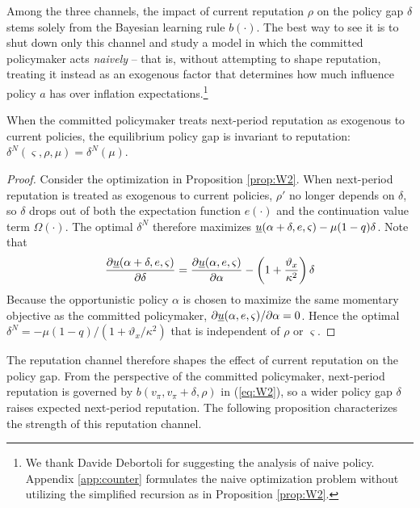 \documentclass[12pt,letter,leqno]{article}
\theoremstyle{asn}
\theoremstyle{lem}
\theoremstyle{slem}
\theoremstyle{prop}
\theoremstyle{appprop}
\theoremstyle{rem}
\theoremstyle{defn}
\begin{document}
Among the three channels, the impact of current reputation $\rho$ on the policy gap $\delta$ stems solely from the Bayesian learning rule $b(\cdot)$. The best way to see it is to shut down only this channel and study a model in which the committed policymaker acts \textit{naively} -- that is, without attempting to shape reputation, treating it instead as an exogenous factor that determines how much influence policy $a$ has over inflation expectations.\footnote{We thank Davide Debortoli for suggesting the analysis of naive policy. Appendix \ref{app:counter} formulates the naive optimization problem without utilizing the simplified recursion as in Proposition \ref{prop:W2}. }

\begin{prop}\label{prop:naive_delta}%
When the committed policymaker treats next-period reputation as exogenous to current policies, the equilibrium policy gap is invariant to reputation: $\delta^N(\varsigma,\rho,\mu)=\delta^N(\mu)$.
\end{prop}

\begin{proof}
Consider the optimization in Proposition \ref{prop:W2}. When next-period reputation is treated as exogenous to current policies, $\rho'$ no longer depends on $\delta$, so $\delta$ drops out of both the expectation function $e(\cdot)$ and the continuation value term $\Omega(\cdot)$. The optimal $\delta^N$ therefore maximizes $\uline{u}(\alpha+\delta,e,\varsigma)-\mu(1-q)\delta$. Note that 
\begin{align}\label{eq:foc_delta}
    \frac{\partial \uline{u}(\alpha+\delta,e,\varsigma)}{\partial \delta} = \frac{\partial \uline{u}(\alpha,e,\varsigma)}{\partial \alpha} -\left(1+\frac{\vartheta_x}{\kappa^2}\right)\delta
\end{align}
Because the opportunistic policy $\alpha$ is chosen to maximize the same momentary objective as the committed policymaker, $\partial \uline{u}(\alpha,e,\varsigma)/\partial \alpha=0$. Hence the optimal $\delta^N=-\mu(1-q)/(1+\vartheta_x/\kappa^2)$ that is independent of $\rho$ or $\varsigma$.
\end{proof}

The reputation channel therefore shapes the effect of current reputation on the policy gap. From the perspective of the committed policymaker, next-period reputation is governed by $b(v_\pi,v_\pi+\delta,\rho)$ in (\ref{eq:W2}), so a wider policy gap $\delta$ raises expected next-period reputation. The following proposition characterizes the strength of this reputation channel.
\end{document}
